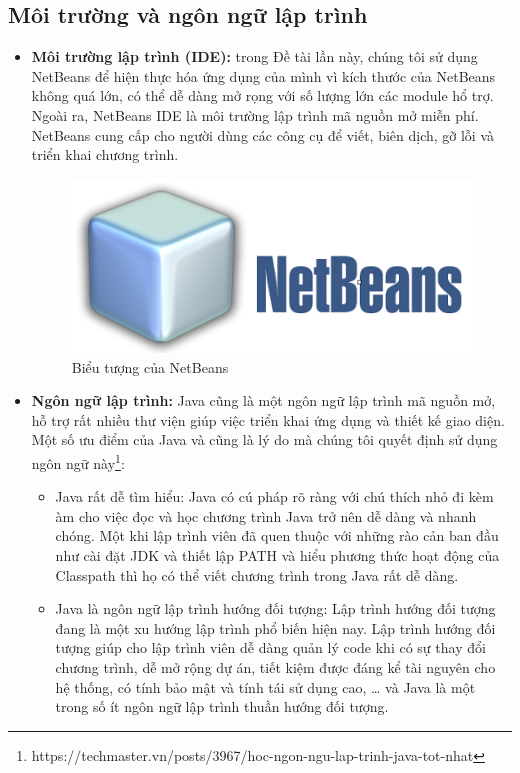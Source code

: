\documentclass[12pt]{report}
\begin{document}
				\subsection{Môi trường và ngôn ngữ lập trình}
					\begin{itemize}
						\item{\textbf{Môi trường lập trình (IDE):}} trong Đề tài lần này, chúng tôi sử dụng NetBeans để hiện thực hóa ứng dụng của mình vì kích thước của NetBeans không quá lớn, có thể dễ dàng mở rọng với số lượng lớn các module hổ trợ. Ngoài ra, NetBeans IDE là môi trường lập trình mã nguồn mở miễn phí. NetBeans cung cấp cho người dùng các công cụ để viết, biên dịch, gỡ lỗi và triển khai chương trình.
					\begin{figure}[H]
					\centering
					\includegraphics[scale=0.7]{images/NetBeans.png}
					\caption[Biểu tượng của NetBeans]{Biểu tượng của NetBeans\protect\footnotemark{}}
					\label{fig:NetBeans}
					\end{figure}
					\item{\textbf{Ngôn ngữ lập trình:}} Java cũng là một ngôn ngữ lập trình mã nguồn mở, hỗ trợ rất nhiều thư viện giúp việc triển khai ứng dụng và thiết kế giao diện. Một số ưu điểm của Java và cũng là lý do mà chúng tôi quyết định sử dụng ngôn ngữ này\footnote{https://techmaster.vn/posts/3967/hoc-ngon-ngu-lap-trinh-java-tot-nhat}:
						\begin{itemize}
							\item{Java rất dễ tìm hiểu: Java có cú pháp rõ ràng với chú thích nhỏ đi kèm àm cho việc đọc và học chương trình Java trở nên dễ dàng và nhanh chóng. Một khi lập trình viên đã quen thuộc với những rào cản ban đầu như cài đặt JDK và thiết lập PATH và hiểu phương thức hoạt động của Classpath thì họ có thể viết chương trình trong Java rất dễ dàng.}
							\item{Java là ngôn ngữ lập trình hướng đối tượng: Lập trình hướng đối tượng đang là một xu hướng lập trình phổ biến hiện nay. Lập trình hướng đối tượng giúp cho lập trình viên dễ dàng quản lý code khi có sự thay đổi chương trình, dễ mở rộng dự án, tiết kiệm được đáng kể tài nguyên cho hệ thống, có tính bảo mật và tính tái sử dụng cao, … và Java là một trong số ít ngôn ngữ lập trình thuần hướng đối tượng.}

\end{itemize}
\end{itemize}
\end{document}
